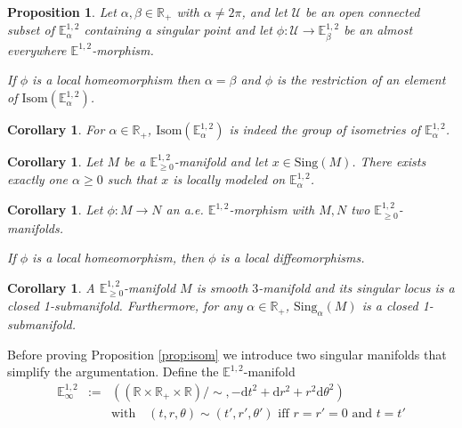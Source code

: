 \documentclass[a4paper,12pt]{article}
\def\U{\mathcal U}
\def\isom{Isom}
\def\R{\mathbb{R}}
\def\E{\mathbf E}
\def\d{\mathrm{d}}
\def\E{\mathbb{E}}
\def\sing{\mathrm{Sing}}
\def\RR{\mathbb{R}}
\newcommand{\mass}[1]{{\mathbb E}^{1,2}_{#1}}
\def\isom{\mathrm{Isom}}
\newtheorem{propou}[lemou]{Proposition}
\newtheorem{corou}[lemou]{Corollary}
\begin{document}
  \begin{propou}\label{btzprop:isom} \label{prop:isom} Let $\alpha,\beta\in \R_+$  with $\alpha\neq 2\pi$, and let $\U$ be an open connected
	  subset of $\E^{1,2}_\alpha$ containing a singular point
	  and let $\phi:\U\rightarrow \E^{1,2}_\beta$ be an  almost everywhere $\mass{}$-morphism. 
	  
	 If $\phi$ is a local homeomorphism then $\alpha=\beta$ and  
	  $\phi$ is the restriction of an element of $\isom(\E^{1,2}_\alpha)$. 
 \end{propou}
\begin{corou}\label{btzcor:indeed_group_isometries}
For $\alpha\in \RR_+$, $\isom(\mass{\alpha})$ is indeed the group of isometries of $\mass{\alpha}$.
\end{corou}
\begin{corou}\label{btzcor:manifold_exists_exactly_one}
	Let $M$ be a $\mass{\geq 0}$-manifold and let $x\in \sing(M)$. There exists exactly one $\alpha\geq 0$ such that $x$ is locally modeled on $\mass{\alpha}$.
\end{corou}
\begin{corou}\label{btzcor:morphism_two_manifolds_local} Let $\phi:M\rightarrow N$ an a.e. $\mass{}$-morphism with $M,N$ two $\mass{\geq0}$-manifolds. 

If $\phi$ is a local homeomorphism, then $\phi$ is a local diffeomorphisms.
\end{corou}
\begin{corou}\label{btzcor:manifold_smooth_manifold_singular}A $\mass{\geq 0}$-manifold $M$ is smooth $3$-manifold and its singular locus is a closed 1-submanifold. Furthermore, for any $\alpha\in \RR_+$, $\sing_\alpha(M)$ is a closed 1-submanifold.

\end{corou}


Before proving Proposition \ref{prop:isom} we introduce two singular manifolds that simplify the argumentation. Define the $\mass{}$-manifold \begin{eqnarray*}
	\mass{\infty}&:=& \left((\RR\times \RR_+\times \RR)/\sim, -\d t^2+\d r^2+r^2\d\theta^2\right) \\ && \text{with} \quad  (t,r,\theta)\sim (t',r',\theta') \text{ iff } r=r'=0 \text{ and } t=t'
\end{eqnarray*}
\end{document}
